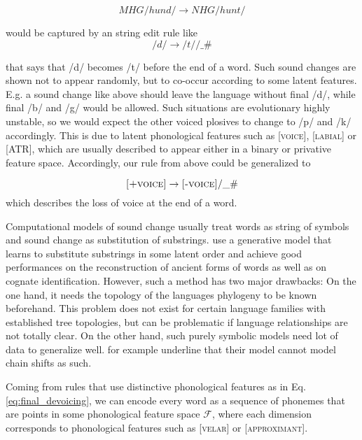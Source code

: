 \documentclass[8pt]{article}
\begin{document}
\begin{equation}
MHG /hund/ \rightarrow NHG /hunt/
\end{equation}

 would be captured by an string edit rule like
\begin{equation}
/d/ \rightarrow /t/ / \_ \#
\end{equation}

that says that /d/ becomes /t/ before the end of a word. Such sound changes are shown not to appear randomly, but to co-occur according to some latent features. E.g. a sound change like above should leave the language without final /d/, while final /b/ and /g/ would be allowed. Such situations are evolutionary highly unstable, so we would expect the other voiced plosives to change to /p/ and /k/ accordingly. This is due to latent phonological features such as \textsc{[voice]}, \textsc{[labial]} or \textsc{[ATR]}, which are usually described to appear either in a binary or privative feature space. Accordingly, our rule from above could be generalized to

\begin{equation}
\textsc{[+voice]} \rightarrow \textsc{[-voice]} / \_ \#
\label{eq:final_devoicing}
\end{equation}
which describes the loss of voice at the end of a word. 

Computational models of sound change usually treat words as string of symbols and sound change as substitution of substrings.\cite{bouchard2007probabilistic,bouchard2013automated} use a generative model that learns to substitute substrings in some latent order and achieve good performances on the reconstruction of ancient forms of words as well as on cognate identification. However, such a method has two major drawbacks: On the one hand, it needs the topology of the languages phylogeny to be known beforehand. This problem does not exist for certain language families with established tree topologies, but can be problematic if language relationships are not totally clear. On the other hand, such purely symbolic models need lot of data to generalize well. \cite{bouchard2007probabilistic} for example underline that their model cannot model chain shifts as such.



Coming from rules that use distinctive phonological features as in Eq. \ref{eq:final_devoicing}, we can encode every word as a sequence of phonemes that are points in some phonological feature space $\mathcal{F}$, where each dimension corresponds to phonological features such as \textsc{[velar]} or \textsc{[approximant]}. 
\end{document}
